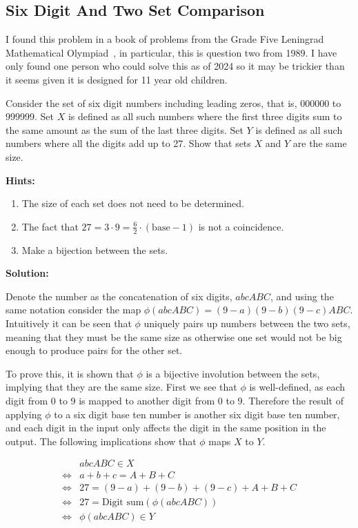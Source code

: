 
\subsection{Six Digit And Two Set Comparison}

I found this problem in a book of problems from the Grade Five Leningrad Mathematical Olympiad~\cite{Grade5LeningradOlympiad}, in particular, this is question two from 1989. I have only found one person who could solve this as of 2024 so it may be trickier than it seems given it is designed for 11 year old children.

Consider the set of six digit numbers including leading zeros, that is, 000000 to 999999. Set $X$ is defined as all such numbers where the first three digits sum to the same amount as the sum of the last three digits. Set $Y$ is defined as all such numbers where all the digits add up to 27. Show that sets $X$ and $Y$ are the same size.

\textbf{Hints:}

\begin{enumerate}
    \item The size of each set does not need to be determined.
    \item The fact that $27 = 3 \cdot 9 = \frac{6}{2} \cdot (\text{base} - 1)$ is not a coincidence.
    \item Make a bijection between the sets.
\end{enumerate}

\textbf{Solution:}

Denote the number as the concatenation of six digits, $abcABC$, and using the same notation consider the map $\phi(abcABC) = (9 - a)(9 - b)(9 - c)ABC$. Intuitively it can be seen that $\phi$ uniquely pairs up numbers between the two sets, meaning that they must be the same size as otherwise one set would not be big enough to produce pairs for the other set.

To prove this, it is shown that $\phi$ is a bijective involution between the sets, implying that they are the same size. First we see that $\phi$ is well-defined, as each digit from 0 to 9 is mapped to another digit from 0 to 9. Therefore the result of applying $\phi$ to a six digit base ten number is another six digit base ten number, and each digit in the input only affects the digit in the same position in the output. The following implications show that $\phi$ maps $X$ to $Y$.

\begin{align*}
    & abcABC \in X  \\
    \iff & a + b + c = A + B + C  \\
    \iff & 27 = (9 - a) + (9 - b) + (9 - c) + A + B + C  \\
    \iff & 27 = \text{Digit sum}(\phi(abcABC))  \\
    \iff & \phi(abcABC) \in Y
\end{align*}

